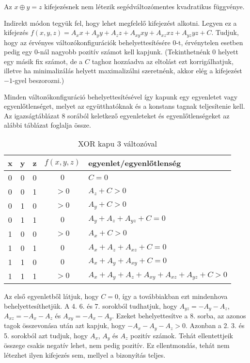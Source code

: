 \begin{theorem}
	\label{XORnotexist}
		Az $x \oplus y = z$ kifejezésnek nem létezik segédváltozómentes kvadratikus függvénye.
		
		Indirekt módon tegyük fel, hogy lehet megfelelő kifejezést alkotni. Legyen ez a kifejezés $f(x,y,z)=A_xx+A_yy+A_zz+A_{xy}xy+A_{xz}xz+A_{yz}yz+C$. Tudjuk, hogy az érvényes változókonfigurációk behelyettesítésére $0$-t, érvénytelen esetben pedig egy $0$-nál nagyobb pozitív számot kell kapjunk. 
		(Tekinthetnénk $0$ helyett egy másik fix számot, de a $C$ taghoz hozzáadva az eltolást ezt korrigálhatjuk, illetve ha minimalizálás helyett maximalizálni szeretnénk, akkor elég a kifejezést $-1$-gyel beszorozni.)
		
		Minden változókonfiguráció behelyettesítésével így kapunk egy egyenletet vagy egyenlőtlenséget, melyet az együtthatóknak és a konstans tagnak teljesítenie kell. Az igazságtáblázat 8 sorából keletkező egyenleteket és egyenlőtlenségeket az alábbi táblázat foglalja össze.
		
		\begin{table}[ht]
			\footnotesize
			\centering
			\begin{tabular}{ c c c c l }
				\toprule
				x & y & z & $f(x,y,z)$ & egyenlet/egyenlőtlenség \\
				\midrule
				0 & 0 & 0 & $0 $ & $C=0$   \\
				0 & 0 & 1 & $>0$ & $A_{z}+C>0$ \\
				0 & 1 & 0 & $>0$ & $A_{y}+C>0$ \\
				0 & 1 & 1 & $0 $ & $A_{y}+A_{z}+A_{yz}+C=0$   \\
				1 & 0 & 0 & $>0$ & $A_{x}+C>0$ \\
				1 & 0 & 1 & $0 $ & $A_{x}+A_{z}+A_{xz}+C=0$   \\
				1 & 1 & 0 & $0 $ & $A_{x}+A_{y}+A_{xy}+C=0$   \\
				1 & 1 & 1 & $>0$ & $A_{x}+A_{y}+A_{z}+A_{xy}+A_{xz}+A_{yz}+C>0$ \\				
				\bottomrule
			\end{tabular}
			\caption{XOR kapu 3 változóval}
			\label{tab:XORgate3var}
		\end{table}
		
		Az első egyenletből látjuk, hogy $C=0$, így a továbbiakban ezt mindenhova behelyettesíthetjük. A 4. 6. és 7. sorokból tudhatjuk, hogy $A_{yz}=-A_y-A_z$, $A_{xz}=-A_x-A_z$ és $A_{xy}=-A_x-A_y$. Ezeket behelyettesítve a 8. sorba, az azonos tagok összevonása után azt kapjuk, hogy $-A_x-A_y-A_z>0$.
		Azonban a 2. 3. és 5. sorokból azt tudjuk, hogy $A_x$, $A_y$ és $A_z$ pozitív számok. Tehát ellentettjeik összege csakis negatív lehet, nem pedig pozitív. Ez ellentmondás, tehát nem létezhet ilyen kifejezés sem, mellyel a bizonyítás teljes.	
\end{theorem}



